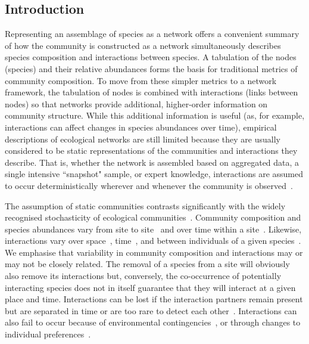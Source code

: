 \documentclass[12pt]{article}
\begin{document}

\linenumbers
\clearpage

\begin{spacing}{2.0}
\section*{Introduction}

    Representing an assemblage of species as a network offers a convenient summary of how the community is constructed as a network simultaneously describes species composition and interactions between species. A tabulation of the nodes (species) and their relative abundances forms the basis for traditional metrics of community composition. To move from these simpler metrics to a network framework, the tabulation of nodes is combined with interactions (links between nodes) so that networks provide additional, higher-order information on community structure. While this additional information is useful (as, for example, interactions can affect changes in species abundances over time), empirical descriptions of ecological networks are still limited because they are usually considered to be static representations of the communities and interactions they describe. That is, whether the network is assembled based on aggregated data, a single intensive ``snapshot" sample, or expert knowledge, interactions are assumed to occur deterministically wherever and whenever the community is observed~\citep{Olesen2011a}. 


    The assumption of static communities contrasts significantly with the widely recognised stochasticity of ecological communities~\citep{Gotelli2000}. Community composition and species abundances vary from site to site~\citep{Baiser2012} and over time within a site~\citep{Olesen2011a}. Likewise, interactions vary over space~\citep{Kitching1987,Baiser2012}, time~\citep{Kitching1987,Olesen2011a}, and between individuals of a given species~\citep{Pires2011a,Fodrie2015,Novak2015}. We emphasise that variability in community composition and interactions may or may not be closely related. The removal of a species from a site will obviously also remove its interactions but, conversely, the co-occurrence of potentially interacting species does not in itself guarantee that they will interact at a given place and time. Interactions can be lost if the interaction partners remain present but are separated in time or are too rare to detect each other~\citep{Tylianakis2010}. Interactions can also fail to occur because of environmental contingencies~\citep{Poisot2015}, or through changes to individual preferences~\citep{Fodrie2015}. 



\end{spacing}
\end{document}
